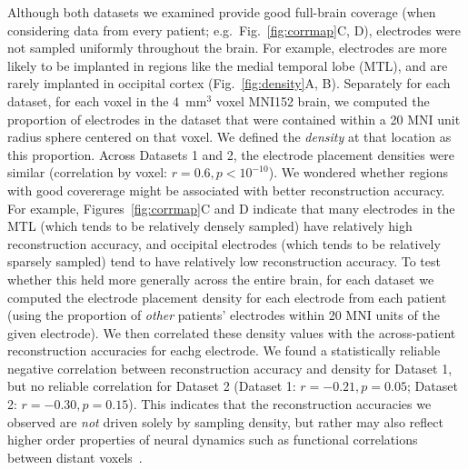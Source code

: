 \documentclass[11pt]{article}
\begin{document}
Although both datasets we examined provide good full-brain coverage (when
considering data from every patient; e.g.\ Fig.~\ref{fig:corrmap}C, D),
electrodes were not sampled uniformly throughout the brain.  For example,
electrodes are more likely to be implanted in regions like the medial temporal
lobe (MTL), and are rarely implanted in occipital cortex
(Fig.~\ref{fig:density}A, B). Separately for each dataset, for each voxel in the
4~mm$^3$ voxel MNI152 brain, we computed the proportion of electrodes in the
dataset that were contained within a 20 MNI unit radius sphere centered on that
voxel.  We defined the \textit{density} at that location as this proportion.
Across Datasets 1 and 2, the electrode placement densities were similar
(correlation by voxel: $r = 0.6, p < 10^{-10}$).  We wondered whether regions
with good covererage might be associated with better reconstruction accuracy.
For example, Figures~\ref{fig:corrmap}C and D indicate that many electrodes in
the MTL (which tends to be relatively densely sampled) have relatively high
reconstruction accuracy, and occipital electrodes (which tends to be relatively
sparsely sampled) tend to have relatively low reconstruction accuracy.  To test
whether this held more generally across the entire brain, for each dataset we
computed the electrode placement density for each electrode from each patient
(using the proportion of \textit{other} patients' electrodes within 20 MNI units
of the given electrode).  We then correlated these density values with the
across-patient reconstruction accuracies for eachg electrode.  We found a
statistically reliable negative correlation between reconstruction accuracy and
density for Dataset 1, but no reliable correlation for Dataset 2 (Dataset 1: $r
= -0.21, p = 0.05$; Dataset 2: $r = -0.30, p = 0.15$).  This indicates that the
reconstruction accuracies we observed are \textit{not} driven solely by sampling
density, but rather may also reflect higher order properties of neural dynamics
such as functional correlations between distant voxels~\citep{BetzEtal17b}.
\end{document}
